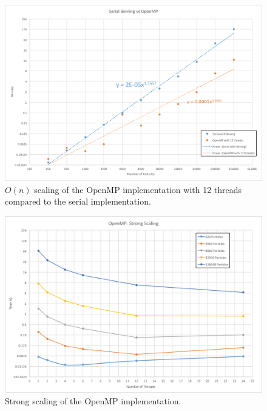 \documentclass[12pt]{article}
\begin{document}
\begin{figure}
\includegraphics[width=\textwidth]{graphs/serial_binning_vs_openMP_12thr.png}
  \caption{$O(n)$ scaling of the OpenMP implementation with 12 threads compared to the serial implementation.}
  \label{fig:openmp-on}
\end{figure}

\begin{figure}
\includegraphics[width=\textwidth]{graphs/openmp_strong_scaling.png}
  \caption{Strong scaling of the OpenMP implementation.}
  \label{fig:openmp-strong}
\end{figure}
\end{document}
